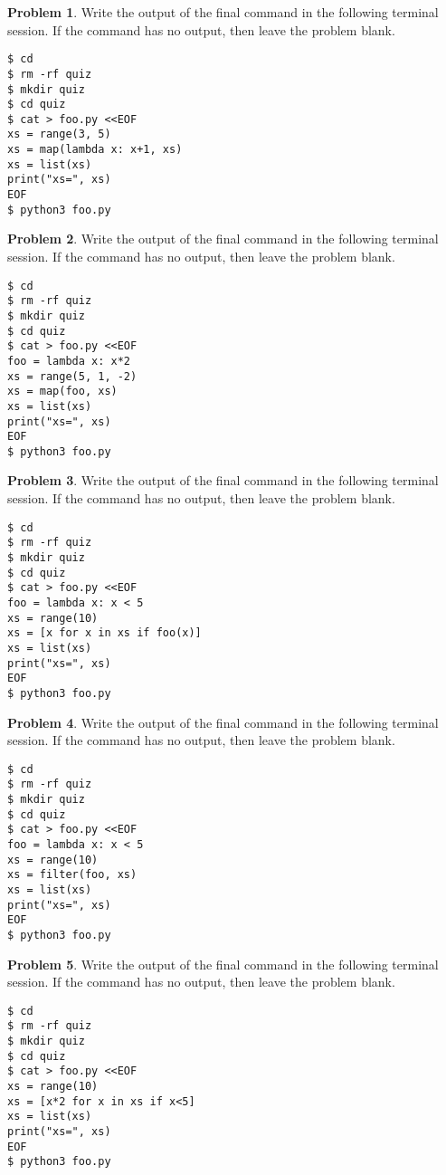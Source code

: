 \documentclass[10pt]{article}
\theoremstyle{definition}
\newtheorem{problem}{Problem}
\begin{document}
\newpage
\begin{problem}
    Write the output of the final command in the following terminal session.
    If the command has no output, then leave the problem blank.
\end{problem}
\begin{lstlisting}
$ cd
$ rm -rf quiz
$ mkdir quiz
$ cd quiz
$ cat > foo.py <<EOF
xs = range(3, 5)
xs = map(lambda x: x+1, xs)
xs = list(xs)
print("xs=", xs)
EOF
$ python3 foo.py
\end{lstlisting}
\vspace{0.4in}

\begin{problem}
    Write the output of the final command in the following terminal session.
    If the command has no output, then leave the problem blank.
\end{problem}
\begin{lstlisting}
$ cd
$ rm -rf quiz
$ mkdir quiz
$ cd quiz
$ cat > foo.py <<EOF
foo = lambda x: x*2
xs = range(5, 1, -2)
xs = map(foo, xs)
xs = list(xs)
print("xs=", xs)
EOF
$ python3 foo.py
\end{lstlisting}
\vspace{0.4in}

\begin{problem}
    Write the output of the final command in the following terminal session.
    If the command has no output, then leave the problem blank.
\end{problem}
\begin{lstlisting}
$ cd
$ rm -rf quiz
$ mkdir quiz
$ cd quiz
$ cat > foo.py <<EOF
foo = lambda x: x < 5
xs = range(10)
xs = [x for x in xs if foo(x)]
xs = list(xs)
print("xs=", xs)
EOF
$ python3 foo.py
\end{lstlisting}
\vspace{0.4in}

\begin{problem}
    Write the output of the final command in the following terminal session.
    If the command has no output, then leave the problem blank.
\end{problem}
\begin{lstlisting}
$ cd
$ rm -rf quiz
$ mkdir quiz
$ cd quiz
$ cat > foo.py <<EOF
foo = lambda x: x < 5
xs = range(10)
xs = filter(foo, xs)
xs = list(xs)
print("xs=", xs)
EOF
$ python3 foo.py
\end{lstlisting}
\vspace{0.4in}

\begin{problem}
    Write the output of the final command in the following terminal session.
    If the command has no output, then leave the problem blank.
\end{problem}
\begin{lstlisting}
$ cd
$ rm -rf quiz
$ mkdir quiz
$ cd quiz
$ cat > foo.py <<EOF
xs = range(10)
xs = [x*2 for x in xs if x<5]
xs = list(xs)
print("xs=", xs)
EOF
$ python3 foo.py
\end{lstlisting}
\vspace{0.4in}
\end{document}
